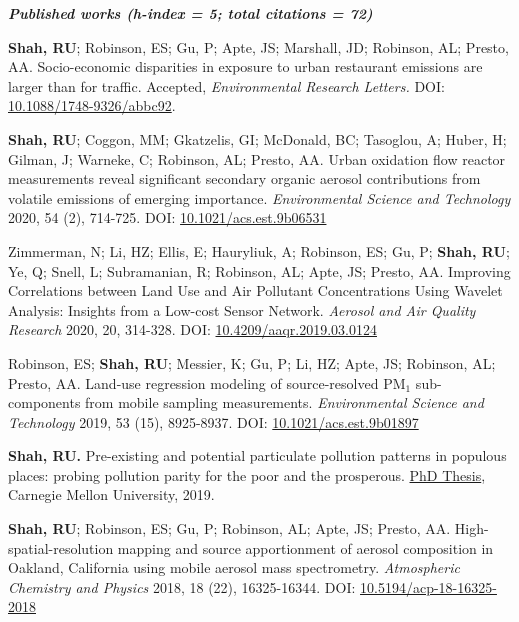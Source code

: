 \documentclass{article}
\begin{document}
\hrulefill
\textit{\textbf{  Published works (h-index = 5; total citations = 72)  }}
\hrulefill
\begin{etaremune}
\item \textbf{Shah, RU}; Robinson, ES; Gu, P; Apte, JS; Marshall, JD; Robinson, AL; Presto, AA. Socio-economic disparities in exposure to urban restaurant emissions are larger than for traffic. Accepted, \textit{Environmental Research Letters.} DOI: \href{https://iopscience.iop.org/article/10.1088/1748-9326/abbc92}{10.1088/1748-9326/abbc92}.
\item \textbf{Shah, RU}; Coggon, MM; Gkatzelis, GI; McDonald, BC; Tasoglou, A; Huber, H; Gilman, J; Warneke, C; Robinson, AL; Presto, AA. Urban oxidation flow reactor measurements reveal significant secondary organic aerosol contributions from volatile emissions of emerging importance. \textit{Environmental Science and Technology} 2020, 54 (2), 714-725. DOI: \href{https://doi.org/10.1021/acs.est.9b06531}{10.1021/acs.est.9b06531}
\item Zimmerman, N; Li, HZ; Ellis, E; Hauryliuk, A; Robinson, ES; Gu, P; \textbf{Shah, RU}; Ye, Q; Snell, L; Subramanian, R; Robinson, AL; Apte, JS; Presto, AA. Improving Correlations between Land Use and Air Pollutant Concentrations Using Wavelet Analysis: Insights from a Low-cost Sensor Network. \textit{Aerosol and Air Quality Research} 2020, 20, 314-328. DOI: \href{http://www.aaqr.org/doi/10.4209/aaqr.2019.03.0124}{10.4209/aaqr.2019.03.0124}
\item Robinson, ES; \textbf{Shah, RU}; Messier, K; Gu, P; Li, HZ; Apte, JS; Robinson, AL; Presto, AA. Land-use regression modeling of source-resolved PM$_1$ sub-components from mobile sampling measurements. \textit{Environmental Science and Technology} 2019, 53 (15), 8925-8937. DOI: \href{https://doi.org/10.1021/acs.est.9b01897}{10.1021/acs.est.9b01897}
\item \textbf{Shah, RU.} Pre-existing and potential particulate pollution patterns in populous places: probing pollution parity for the poor and the prosperous. \href{https://search.proquest.com/openview/a52fa8ba9f1b4ffe2e6e7b09ca6e2397/1.pdf?pq-origsite=gscholar&cbl=18750&diss=y}{PhD Thesis}, Carnegie Mellon University, 2019.
\item \textbf{Shah, RU}; Robinson, ES; Gu, P; Robinson, AL; Apte, JS; Presto, AA. High-spatial-resolution mapping and source apportionment of aerosol composition in Oakland, California using mobile aerosol mass spectrometry. \textit{Atmospheric Chemistry and Physics} 2018, 18 (22), 16325-16344. DOI: \href{https://www.atmos-chem-phys.net/18/16325/2018/}{10.5194/acp-18-16325-2018}

\end{etaremune}
\end{document}
